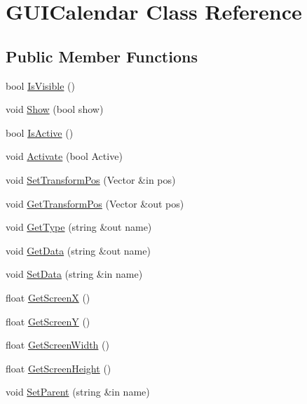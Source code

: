 \hypertarget{class_g_u_i_calendar}{}\section{G\+U\+I\+Calendar Class Reference}
\label{class_g_u_i_calendar}
\subsection*{Public Member Functions}
\begin{DoxyCompactItemize}
\item 
bool \hyperlink{class_g_u_i_calendar_a9788a8c732119ae1581606ce7b594c69}{Is\+Visible} ()
\item 
void \hyperlink{class_g_u_i_calendar_a5f83aede949ec4c075fb3ba872a26a64}{Show} (bool show)
\item 
bool \hyperlink{class_g_u_i_calendar_a26443bcd88bb3526e7947072a0535d1b}{Is\+Active} ()
\item 
void \hyperlink{class_g_u_i_calendar_a809de54fe302cb780c12378de281a029}{Activate} (bool Active)
\item 
void \hyperlink{class_g_u_i_calendar_a3b9c5ec2417622452450550dd02273bf}{Set\+Transform\+Pos} (Vector \&in pos)
\item 
void \hyperlink{class_g_u_i_calendar_a1dcf963cf9dcdb69201d522640c2a553}{Get\+Transform\+Pos} (Vector \&out pos)
\item 
void \hyperlink{class_g_u_i_calendar_a4082b43dd37621774b9772feec3b960f}{Get\+Type} (string \&out name)
\item 
void \hyperlink{class_g_u_i_calendar_a7b98d82eb5905ceffa6a58110dbdf4dc}{Get\+Data} (string \&out name)
\item 
void \hyperlink{class_g_u_i_calendar_a582df5083c47ff53fb725eba6cb0ea84}{Set\+Data} (string \&in name)
\item 
float \hyperlink{class_g_u_i_calendar_aa05f68718b7f3c0728c11722fdcfc8af}{Get\+ScreenX} ()
\item 
float \hyperlink{class_g_u_i_calendar_a76fe79c1dbf5f778fd823d743ec2d496}{Get\+ScreenY} ()
\item 
float \hyperlink{class_g_u_i_calendar_a0e71b9f86c524369f82601de8156efad}{Get\+Screen\+Width} ()
\item 
float \hyperlink{class_g_u_i_calendar_a0176610588e58488c8c5976cbbdce873}{Get\+Screen\+Height} ()
\item 
void \hyperlink{class_g_u_i_calendar_af2a571544aebf75727af0495d8e00803}{Set\+Parent} (string \&in name)

\end{DoxyCompactItemize}
